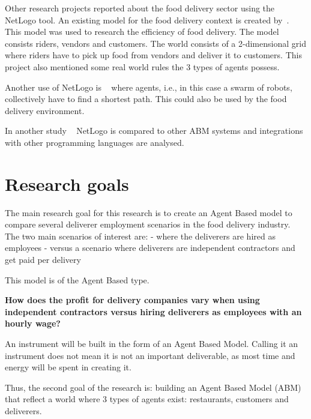 Other research projects reported about the food delivery sector using the NetLogo tool.
An existing model for the food delivery context is created by~\cite{ismail2024software}.
This model was used to research the efficiency of food delivery.
The model consists riders, vendors and customers.
The world consists of a 2-dimensional grid where riders have to pick up food from vendors and deliver it to customers.
This project also mentioned some real world rules the 3 types of agents possess.

Another use of NetLogo is ~\cite{chella2023quantum} where agents, i.e., in this case a swarm of robots, collectively have to find a shortest path.
This could also be used by the food delivery environment.

In another study ~\cite{antelmi2024reliable} NetLogo is compared to other ABM systems and integrations with other programming languages are analysed.



\section{Research goals}

The main research goal for this research is to create an Agent Based model to compare several deliverer employment scenarios  in the food delivery industry.
The two main scenarios of interest are:
    - where the deliverers are hired as employees
    - versus a scenario where deliverers are independent contractors and get paid per delivery

This model is of the Agent Based type.



\cite{hamill2016agent}




\textbf{How does the profit for delivery companies vary when using independent contractors versus hiring deliverers as employees with an hourly wage? }

An instrument will be built in the form of an Agent Based Model.
Calling it an instrument does not mean it is not an important deliverable, as most time and energy will be spent in creating it.

Thus, the second goal of the research is: building an Agent Based Model (ABM) that reflect a world where 3 types of agents exist: restaurants, customers and deliverers.

